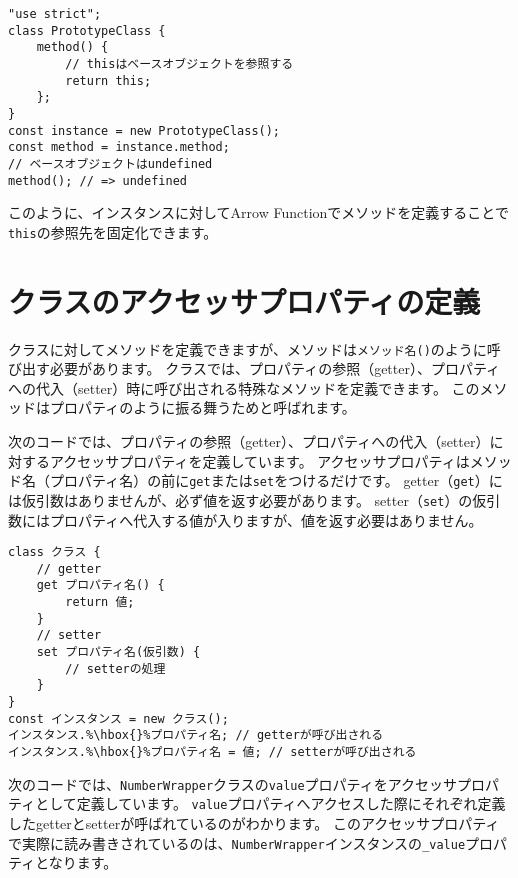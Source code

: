 \begin{lstlisting}
"use strict";
class PrototypeClass {
    method() {
        // thisはベースオブジェクトを参照する
        return this;
    };
}
const instance = new PrototypeClass();
const method = instance.method;
// ベースオブジェクトはundefined
method(); // => undefined
\end{lstlisting}

このように、インスタンスに対してArrow
Functionでメソッドを定義することで\texttt{this}の参照先を固定化できます。

\hypertarget{class-accessor-property}{%
\section{クラスのアクセッサプロパティの定義}\label{class-accessor-property}}

クラスに対してメソッドを定義できますが、メソッドは\texttt{メソッド名()}のように呼び出す必要があります。
クラスでは、プロパティの参照（getter）、プロパティへの代入（setter）時に呼び出される特殊なメソッドを定義できます。
このメソッドはプロパティのように振る舞うため\textbf{}と呼ばれます。

次のコードでは、プロパティの参照（getter）、プロパティへの代入（setter）に対するアクセッサプロパティを定義しています。
アクセッサプロパティはメソッド名（プロパティ名）の前に\texttt{get}または\texttt{set}をつけるだけです。
getter（\texttt{get}）には仮引数はありませんが、必ず値を返す必要があります。
setter（\texttt{set}）の仮引数にはプロパティへ代入する値が入りますが、値を返す必要はありません。

\begin{lstlisting}[escapechar=\%]
class クラス {
    // getter
    get プロパティ名() {
        return 値;
    }
    // setter
    set プロパティ名(仮引数) {
        // setterの処理
    }
}
const インスタンス = new クラス();
インスタンス.%\hbox{}%プロパティ名; // getterが呼び出される
インスタンス.%\hbox{}%プロパティ名 = 値; // setterが呼び出される
\end{lstlisting}

次のコードでは、\texttt{NumberWrapper}クラスの\texttt{value}プロパティをアクセッサプロパティとして定義しています。
\texttt{value}プロパティへアクセスした際にそれぞれ定義したgetterとsetterが呼ばれているのがわかります。
このアクセッサプロパティで実際に読み書きされているのは、\texttt{NumberWrapper}インスタンスの\texttt{\_value}プロパティとなります。

